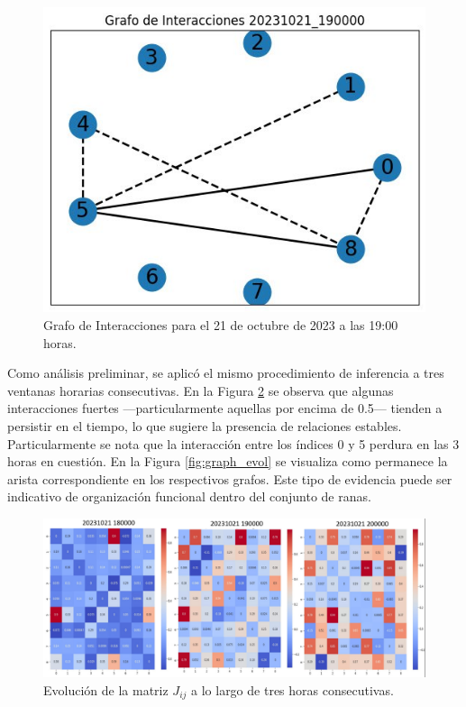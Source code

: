 \documentclass[a4paper,10pt,twocolumn]{article}
\begin{document}
\begin{figure}[h!]
    \centering
    \includegraphics[width=\columnwidth]{assets/corr_graph.jpg}
    \caption{Grafo de Interacciones para el 21 de octubre de 2023 a las 19:00 horas.}
    \label{fig:graph}
\end{figure}

Como análisis preliminar, se aplicó el mismo procedimiento de 
inferencia a tres ventanas horarias consecutivas. 
En la Figura \ref{fig:jij_evol} se observa que algunas interacciones fuertes —particularmente 
aquellas por encima de 0.5— tienden a persistir en el tiempo, 
lo que sugiere la presencia de relaciones estables. 
Particularmente se nota que la interacción entre los índices 0 y 5 
perdura en las 3 horas en cuestión. En la Figura \ref{fig:graph_evol}
se visualiza como permanece la arista correspondiente en los respectivos grafos.
Este tipo de evidencia puede ser 
indicativo de organización funcional dentro del conjunto de 
ranas.

\begin{figure}[h!]
    \centering
    \includegraphics[width=\columnwidth]{assets/3_matrixs.jpg}
    \caption{Evolución de la matriz \( J_{ij} \) a lo largo de tres horas consecutivas.}
    \label{fig:jij_evol}
\end{figure}
\end{document}
